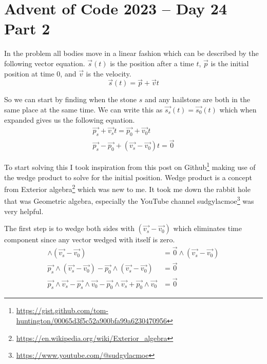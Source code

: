 \documentclass[11pt]{article}
\begin{document}
\section*{Advent of Code 2023 – Day 24 Part 2}

In the problem all bodies move in a linear fashion which can be described
by the following vector equation. $\vec{s}(t)$ is the position after a time $t$,
$\vec{p}$ is the initial position at time 0, and $\vec{v}$ is the velocity.
\begin{equation}
    \vec{s}(t) = \vec{p} + \vec{v}t
\end{equation}

So we can start by finding when the stone $s$ and any hailstone are both in the same place
at the same time. We can write this as $\vec{s_s}(t) = \vec{s_0}(t)$ which when expanded gives
us the following equation.
\begin{align}
    \vec{p_s} + \vec{v_s}t = \vec{p_0} + \vec{v_0}t \\
    \vec{p_s} - \vec{p_0} + (\vec{v_s} - \vec{v_0})t = \vec{0}
\end{align}

To start solving this I took inspiration from this post on
Github\footnote{\url{https://gist.github.com/tom-huntington/00065d3f5c52a900bfa99a6230470956}}
making use of the wedge product to solve for the initial position. Wedge product is a
concept from Exterior algebra\footnote{\url{https://en.wikipedia.org/wiki/Exterior_algebra}} which
was new to me. It took me down the rabbit hole that was Geometric algebra, especially the YouTube
channel sudgylacmoe\footnote{\url{https://www.youtube.com/@sudgylacmoe}} was very helpful.

The first step is to wedge both sides with $(\vec{v_s} - \vec{v_0})$ which eliminates time
component since any vector wedged with itself is zero.
\begin{align}
    [\vec{p_s} - \vec{p_0} + (\vec{v_s} - \vec{v_0})t] \wedge (\vec{v_s} - \vec{v_0}) &= \vec{0} \wedge (\vec{v_s} - \vec{v_0}) \nonumber \\
    \vec{p_s} \wedge (\vec{v_s} - \vec{v_0}) - \vec{p_0} \wedge (\vec{v_s} - \vec{v_0})  &= \vec{0} \nonumber \\
    \vec{p_s} \wedge \vec{v_s} - \vec{p_s} \wedge \vec{v_0} - \vec{p_0} \wedge \vec{v_s} + \vec{p_0} \wedge \vec{v_0}  &= \vec{0} \nonumber 
\end{align}
\end{document}
